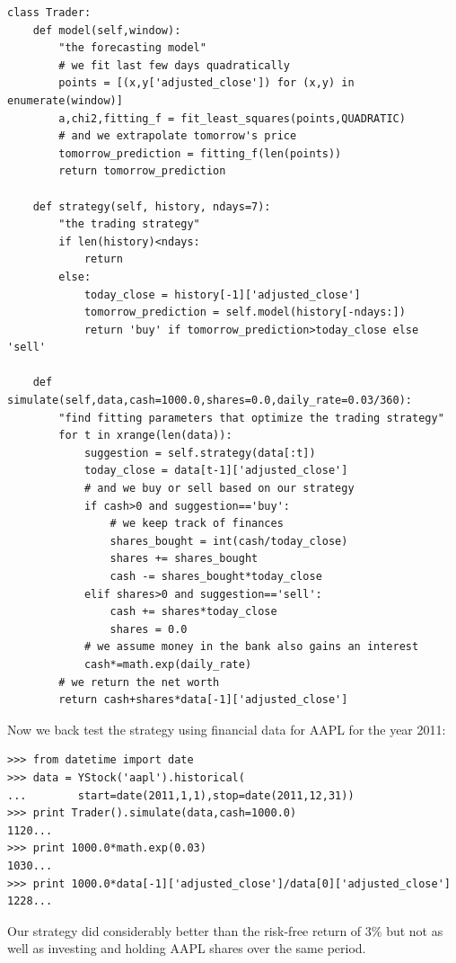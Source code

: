 \documentclass[justified,sixbynine]{tufte-book}
\def\ft{\small\tt}
\theoremstyle{plain}%
\theoremstyle{definition}
\theoremstyle{remark}
\begin{document}
\begin{fullwidth}

\begin{lstlisting}[caption={in file: {\ft nlib.py}}]
class Trader:
    def model(self,window):
        "the forecasting model"
        # we fit last few days quadratically
        points = [(x,y['adjusted_close']) for (x,y) in enumerate(window)]
        a,chi2,fitting_f = fit_least_squares(points,QUADRATIC)
        # and we extrapolate tomorrow's price
        tomorrow_prediction = fitting_f(len(points))
        return tomorrow_prediction

    def strategy(self, history, ndays=7):
        "the trading strategy"
        if len(history)<ndays:
            return
        else:
            today_close = history[-1]['adjusted_close']
            tomorrow_prediction = self.model(history[-ndays:])
            return 'buy' if tomorrow_prediction>today_close else 'sell'

    def simulate(self,data,cash=1000.0,shares=0.0,daily_rate=0.03/360):
        "find fitting parameters that optimize the trading strategy"
        for t in xrange(len(data)):
            suggestion = self.strategy(data[:t])
            today_close = data[t-1]['adjusted_close']
            # and we buy or sell based on our strategy
            if cash>0 and suggestion=='buy':
                # we keep track of finances
                shares_bought = int(cash/today_close)
                shares += shares_bought
                cash -= shares_bought*today_close
            elif shares>0 and suggestion=='sell':
                cash += shares*today_close
                shares = 0.0
            # we assume money in the bank also gains an interest
            cash*=math.exp(daily_rate)
        # we return the net worth
        return cash+shares*data[-1]['adjusted_close']
\end{lstlisting}

Now we back test the strategy using financial data for AAPL for the year 2011:

\begin{lstlisting}[caption={in file: {\ft nlib.py}}]
>>> from datetime import date
>>> data = YStock('aapl').historical(
...        start=date(2011,1,1),stop=date(2011,12,31))
>>> print Trader().simulate(data,cash=1000.0)
1120...
>>> print 1000.0*math.exp(0.03)
1030...
>>> print 1000.0*data[-1]['adjusted_close']/data[0]['adjusted_close']
1228...
\end{lstlisting}

Our strategy did considerably better than the risk-free return of 3\% but not as well as investing and holding AAPL shares over the same period.


\end{fullwidth}
\end{document}
